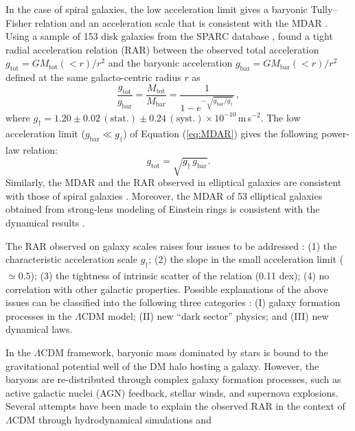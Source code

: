 \documentclass[a4paper,iop,twocolumn,twocolappendix,numberedappendix,appendixfloats]{emulateapj}
\newcommand{\Mtot}{M_\mathrm{tot}}
\newcommand{\Mbar}{M_\mathrm{bar}}
\newcommand{\gbar}{g_\mathrm{bar}}
\newcommand{\gtot}{g_\mathrm{tot}}
\begin{document}
In the case of spiral galaxies, the low acceleration limit gives a
    baryonic Tully--Fisher relation and an acceleration scale that is
    consistent with the MDAR \citep{McGaugh11}.
    Using a sample of 153 disk galaxies from the SPARC database \citep{Lelli16},
    \citet{McGaugh16} found a tight radial acceleration relation (RAR)
    between the observed total acceleration $\gtot=G\Mtot(<r)/r^2$
    and the baryonic acceleration
    $\gbar=G\Mbar(<r)/r^2$
    defined at the same galacto-centric radius $r$ as
    \begin{equation}
     \label{eq:MDAR}
      \frac{\gtot}{\gbar}=\frac{\Mtot}{\Mbar}=\frac{1}{1-e^{-\sqrt{\gbar/g_{\dag}}}}\,,
    \end{equation}
where
$g_{\dag}=1.20\pm0.02\,(\mathrm{stat.})\pm0.24\,(\mathrm{syst.})\times10^{-10}$\,m\,s$^{-2}$.
The low acceleration limit ($\gbar\ll g_\dag$) of Equation
(\ref{eq:MDAR}) gives the following power-law relation:
\begin{equation}
 \label{eq:MDARlow}
 \gtot = \sqrt{g_\dag\,\gbar}.
\end{equation}
Similarly, the MDAR \citep{Scarpa06, Janz16, TK16} and
the RAR observed in elliptical galaxies are consistent with those
of spiral galaxies \citep{Lelli17, Rong18, Chae19, Milgrom19, TK19}.
Moreover, the MDAR of 53 elliptical galaxies obtained from strong-lens
    modeling of Einstein rings is consistent with the dynamical results
    \citep{TK17}.

The RAR observed on galaxy scales raises four issues to be addressed
    \citep{Desmond17, Lelli17}:
    (1) the characteristic acceleration scale $g_{\dag}$;
    (2) the slope in the small acceleration limit ($\simeq 0.5$);
    (3) the tightness of intrinsic scatter of the relation (0.11 dex);
    (4) no correlation with other galactic properties.
Possible explanations of the above issues can be classified into the
    following three categories \citep{McGaugh16, Lelli17}:
    (I) galaxy formation processes in the ${\Lambda}$CDM model;
    (II) new ``dark sector'' physics; and
    (III) new dynamical laws.

    In the ${\Lambda}$CDM framework, baryonic mass dominated by stars is
    bound to the gravitational potential well of the DM halo
    hosting a galaxy.
    However, the baryons are re-distributed through complex galaxy formation
    processes, such as active galactic nuclei (AGN) feedback,
    stellar winds, and supernova explosions.
    Several attempts have been made to explain the observed RAR in the
    context of $\Lambda$CDM through hydrodynamical simulations
    \citep{WK15, Ludlow17}
    and
\end{document}
